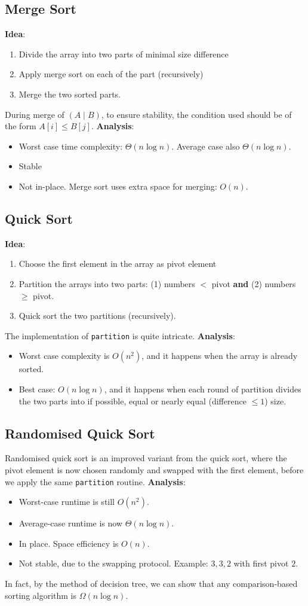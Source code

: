 \documentclass[12pt]{article}
\theoremstyle{definition}
\newcommand{\T}{\Theta}
\newcommand{\Omg}{\Omega}
\begin{document}
\subsection{Merge Sort}
\textbf{Idea}:
\begin{enumerate}
  \item Divide the array into two parts of minimal size difference
  \item Apply merge sort on each of the part (recursively)
  \item Merge the two sorted parts.
\end{enumerate}
During merge of $(A\mid B)$, to ensure stability, the condition used should be of the form $A[i]\leq B[j]$.
\textbf{Analysis}:
\begin{itemize}
  \item Worst case time complexity: $\T(n\log n)$. Average case also $\T(n\log n)$.
  \item Stable
  \item Not in-place. Merge sort uses extra space for merging: $O(n)$.
\end{itemize}
\subsection{Quick Sort}
\textbf{Idea}:
\begin{enumerate}
  \item Choose the first element in the array as pivot element
  \item Partition the arrays into two parts: (1) numbers $<$ pivot \textbf{and} (2) numbers $\geq$ pivot.
  \item Quick sort the two partitions (recursively).
\end{enumerate} 
The implementation of \texttt{partition} is quite intricate.
\textbf{Analysis}:
\begin{itemize}
\item Worst case complexity is $O(n^2)$, and it happens when the array is already sorted.
\item Best case: $O(n\log n)$, and it happens when each round of partition divides the two parts into if possible, equal or nearly equal (difference $\leq 1$) size.
\end{itemize}
\subsection{Randomised Quick Sort}
Randomised quick sort is an improved variant from the quick sort, where the pivot element is now chosen randomly and swapped with the first element, before we apply the same \texttt{partition} routine.
\textbf{Analysis}:
\begin{itemize}
  \item Worst-case runtime is still $O(n^2)$.
  \item Average-case runtime is now $\T(n\log n)$. 
  \item In place. Space efficiency is $O(n)$.
  \item Not stable, due to the swapping protocol. Example: $3,3,2$ with first pivot $2$.
\end{itemize}
In fact, by the method of decision tree, we can show that any comparison-based sorting algorithm is $\Omg(n\log n)$.
\end{document}

